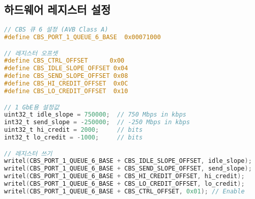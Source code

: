 \documentclass[12pt, a4paper]{article}
\begin{document}
\subsection{하드웨어 레지스터 설정}

\begin{lstlisting}[language=C, caption=LAN9662 CBS 레지스터 구성]
// CBS 큐 6 설정 (AVB Class A)
#define CBS_PORT_1_QUEUE_6_BASE  0x00071000

// 레지스터 오프셋
#define CBS_CTRL_OFFSET      0x00
#define CBS_IDLE_SLOPE_OFFSET 0x04
#define CBS_SEND_SLOPE_OFFSET 0x08
#define CBS_HI_CREDIT_OFFSET  0x0C
#define CBS_LO_CREDIT_OFFSET  0x10

// 1 GbE용 설정값
uint32_t idle_slope = 750000;  // 750 Mbps in kbps
int32_t send_slope = -250000;  // -250 Mbps in kbps
uint32_t hi_credit = 2000;     // bits
int32_t lo_credit = -1000;     // bits

// 레지스터 쓰기
writel(CBS_PORT_1_QUEUE_6_BASE + CBS_IDLE_SLOPE_OFFSET, idle_slope);
writel(CBS_PORT_1_QUEUE_6_BASE + CBS_SEND_SLOPE_OFFSET, send_slope);
writel(CBS_PORT_1_QUEUE_6_BASE + CBS_HI_CREDIT_OFFSET, hi_credit);
writel(CBS_PORT_1_QUEUE_6_BASE + CBS_LO_CREDIT_OFFSET, lo_credit);
writel(CBS_PORT_1_QUEUE_6_BASE + CBS_CTRL_OFFSET, 0x01); // Enable
\end{lstlisting}
\end{document}
